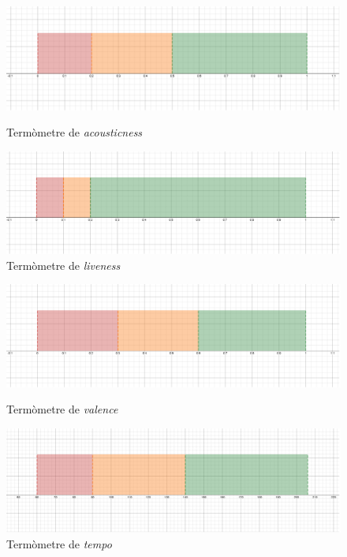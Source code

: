 \begin{figure}[H]
\centering
    \begin{minipage}{.49\textwidth}
        \centering
        \includegraphics[width=0.95\linewidth]{Images/5_TLP/acousticness_term.png}
        \caption{Termòmetre de \emph{acousticness}}
        \label{fig:5_TLP:acousticness}
    \end{minipage}%
    \begin{minipage}{.49\textwidth}
        \centering
        \includegraphics[width=0.95\linewidth]{Images/5_TLP/liveness_term.png}
        \caption{Termòmetre de \emph{liveness}}
        \label{fig:5_TLP:liveness}
    \end{minipage}%
\end{figure}

\begin{figure}[H]
\centering
    \begin{minipage}{.49\textwidth}
        \centering
        \includegraphics[width=0.95\linewidth]{Images/5_TLP/valence_term.png}
        \caption{Termòmetre de \emph{valence}}
        \label{fig:5_TLP:valence}
    \end{minipage}%
    \begin{minipage}{.49\textwidth}
        \centering
        \includegraphics[width=0.95\linewidth]{Images/5_TLP/tempo_term.png}
        \caption{Termòmetre de \emph{tempo}}
        \label{fig:5_TLP:tempo}
    \end{minipage}%
\end{figure}

